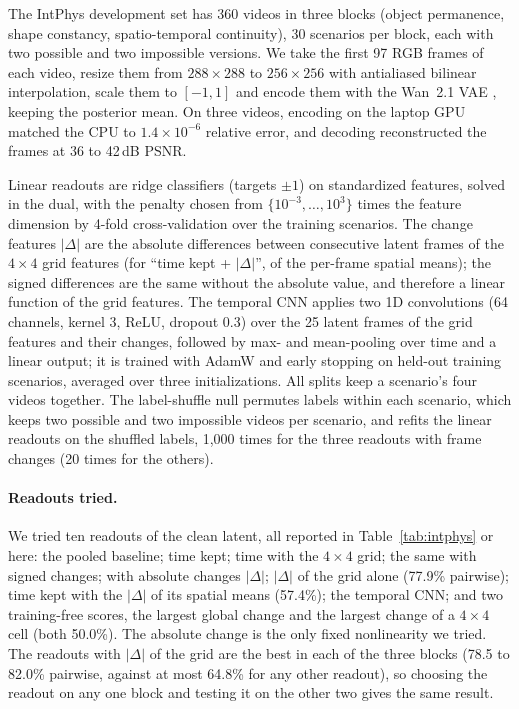 The IntPhys development set \citep{riochet2018intphys} has 360 videos in three blocks (object permanence, shape constancy, spatio-temporal continuity), 30 scenarios per block, each with two possible and two impossible versions. We take the first 97 RGB frames of each video, resize them from $288 \times 288$ to $256 \times 256$ with antialiased bilinear interpolation, scale them to $[-1, 1]$ and encode them with the Wan~2.1 VAE \citep{wan2025}, keeping the posterior mean. On three videos, encoding on the laptop GPU matched the CPU to $1.4 \times 10^{-6}$ relative error, and decoding reconstructed the frames at 36 to 42\,dB PSNR.

Linear readouts are ridge classifiers (targets $\pm 1$) on standardized features, solved in the dual, with the penalty chosen from $\{10^{-3}, \dots, 10^{3}\}$ times the feature dimension by 4-fold cross-validation over the training scenarios. The change features $|\Delta|$ are the absolute differences between consecutive latent frames of the $4 \times 4$ grid features (for ``time kept + $|\Delta|$'', of the per-frame spatial means); the signed differences are the same without the absolute value, and therefore a linear function of the grid features. The temporal CNN applies two 1D convolutions (64 channels, kernel 3, ReLU, dropout 0.3) over the 25 latent frames of the grid features and their changes, followed by max- and mean-pooling over time and a linear output; it is trained with AdamW and early stopping on held-out training scenarios, averaged over three initializations. All splits keep a scenario's four videos together. The label-shuffle null permutes labels within each scenario, which keeps two possible and two impossible videos per scenario, and refits the linear readouts on the shuffled labels, 1,000 times for the three readouts with frame changes (20 times for the others).

\paragraph{Readouts tried.} We tried ten readouts of the clean latent, all reported in Table~\ref{tab:intphys} or here: the pooled baseline; time kept; time with the $4 \times 4$ grid; the same with signed changes; with absolute changes $|\Delta|$; $|\Delta|$ of the grid alone (77.9\% pairwise); time kept with the $|\Delta|$ of its spatial means (57.4\%); the temporal CNN; and two training-free scores, the largest global change and the largest change of a $4 \times 4$ cell (both 50.0\%). The absolute change is the only fixed nonlinearity we tried. The readouts with $|\Delta|$ of the grid are the best in each of the three blocks (78.5 to 82.0\% pairwise, against at most 64.8\% for any other readout), so choosing the readout on any one block and testing it on the other two gives the same result.

